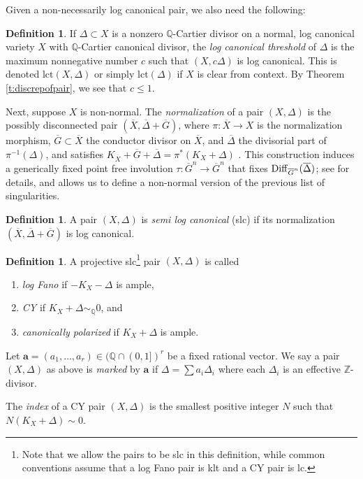 \documentclass[11pt]{amsart}
\numberwithin{equation}{section}
\theoremstyle{definition}
\newtheorem{definition}[theorem]{Definition}
\newtheorem{defn}[theorem]{Definition}
\newcommand{\bQ}{\mathbb{Q}}
\newcommand{\bZ}{\mathbb{Z}}
\newcommand{\lct}{\mathrm{lct}}
\begin{document}
Given a non-necessarily log canonical pair, we also need the following: 

\begin{definition}\label{defn:lc}
    If $\Delta \subset X$ is a nonzero $\bQ$-Cartier divisor on a normal, log canonical variety $X$ with $\bQ$-Cartier canonical divisor, the \textit{log canonical threshold} of $\Delta$ is the maximum nonnegative number $c$ such that $(X,c\Delta)$ is log canonical.  This is denoted $\lct(X,\Delta)$ or simply $\lct(\Delta)$ if $X$ is clear from context. By Theorem \ref{t:discrepofpair}, we see that $c \le 1$. 
\end{definition}


Next, suppose $X$ is non-normal.  The \emph{normalization} of a pair $(X,\Delta)$ is the possibly disconnected pair
$(\overline{X},\overline{\Delta}+\overline{G})$,
where 
$\pi:\overline{X}\to X$ is the normalization morphism, $\overline{G} \subset \overline{X}$ the conductor divisor on $\overline{X}$, and $\overline{\Delta}$  the divisorial part of $\pi^{-1}(\Delta)$, 
and satisfies
$K_{\overline{X}}+\overline{G}+\overline{\Delta}=\pi^*(K_X+\Delta)$ \cite[5.7]{Kol13}.
This construction induces a generically fixed point free involution $\tau:\overline{G}^n\to \overline{G}^n$  that fixes ${\rm Diff}_{\overline{G}^n}(\overline{\Delta})$; see  \cite[5.2 \& 5.11]{Kol13} for details, and allows us to define a non-normal version of the previous list of singularities.

\begin{definition}{\cite[Definition 5.10]{Kol13}}
    A pair $(X,\Delta)$ is \emph{semi log canonical} (slc) if its normalization $(\overline{X},\overline{\Delta}+\overline{G})$ is log canonical.
\end{definition}


\begin{defn}\label{d:FanoCYKSBA}
A projective slc\footnote{Note that we allow the pairs to be slc in this definition, while common conventions assume that a log Fano pair is klt and a CY pair is lc.} pair  $(X,\Delta)$ is called
\begin{enumerate}
	\item \emph{log Fano} if $-K_X-\Delta$ is ample,
	\item  \emph{CY} if $K_{X}+\Delta \sim_{\bQ} 0$, and 
	\item \emph{canonically polarized} if $K_{X}+\Delta$ is ample.
\end{enumerate}

Let $\mathbf{a} = (a_1, \dots, a_r) \in (\bQ\cap (0,1])^r$ be a fixed rational vector.  We say a pair $(X, \Delta)$ as above is \textit{marked} by $\mathbf{a}$ if $\Delta = \sum a_i \Delta_i$ where each $\Delta_i$ is an effective $\bZ$-divisor. 

The \emph{index} of a CY pair $(X,\Delta)$ is the smallest positive integer $N$ such that $N(K_X+\Delta)\sim0$.
\end{defn}
 
\end{document}
